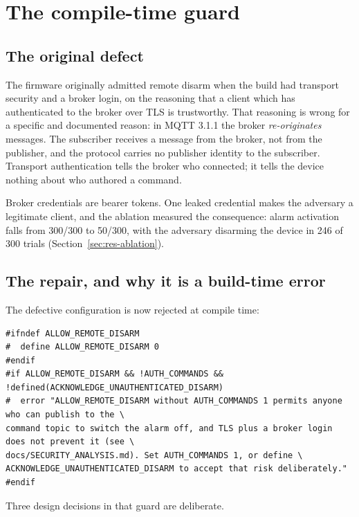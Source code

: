 \section{The compile-time guard}\label{sec:sec-guard}

\subsection{The original defect}

The firmware originally admitted remote disarm when the build had transport security and a
broker login, on the reasoning that a client which has authenticated to the broker over TLS is
trustworthy. That reasoning is wrong for a specific and documented reason: in MQTT 3.1.1 the
broker \emph{re-originates} messages. The subscriber receives a message from the broker, not from
the publisher, and the protocol carries no publisher identity to the subscriber. Transport
authentication tells the broker who connected; it tells the device nothing about who authored a
command.

Broker credentials are bearer tokens. One leaked credential makes the adversary a legitimate
client, and the ablation measured the consequence: alarm activation falls from 300/300 to 50/300,
with the adversary disarming the device in 246 of 300 trials
(Section~\ref{sec:res-ablation}).

\subsection{The repair, and why it is a build-time error}

The defective configuration is now rejected at compile time:

\begin{lstlisting}[style=cpp,caption={The build guard. The configuration cannot be built
accidentally.},label={lst:sec-guard}]
#ifndef ALLOW_REMOTE_DISARM
#  define ALLOW_REMOTE_DISARM 0
#endif
#if ALLOW_REMOTE_DISARM && !AUTH_COMMANDS && !defined(ACKNOWLEDGE_UNAUTHENTICATED_DISARM)
#  error "ALLOW_REMOTE_DISARM without AUTH_COMMANDS 1 permits anyone who can publish to the \
command topic to switch the alarm off, and TLS plus a broker login does not prevent it (see \
docs/SECURITY_ANALYSIS.md). Set AUTH_COMMANDS 1, or define \
ACKNOWLEDGE_UNAUTHENTICATED_DISARM to accept that risk deliberately."
#endif
\end{lstlisting}

Three design decisions in that guard are deliberate.

